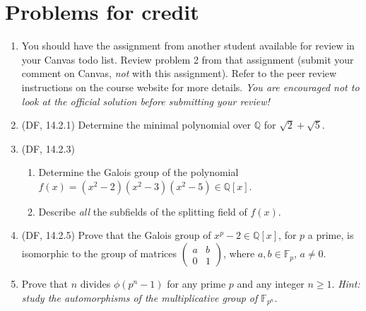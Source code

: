 \documentclass{amsart}
\theoremstyle{definition}
\newcommand{\Qq}{\mathbb{Q}}
\newcommand{\Ff}{\mathbb{F}}
\begin{document}
\section*{Problems for credit}
\begin{enumerate}
\item You should have the assignment from another student available for review in your Canvas todo list. Review problem 2 from that assignment (submit your comment on Canvas, \emph{not} with this assignment). Refer to the peer review instructions on the course website for more details. \emph{You are encouraged not to look at the official solution before submitting your review!}

\item (DF, 14.2.1) Determine the minimal polynomial over $\Qq$ for $\sqrt{2} + \sqrt{5}$.
\item (DF, 14.2.3)
  \begin{enumerate}
  \item Determine the Galois group of the polynomial $f(x) = (x^2 - 2)(x^2 - 3)(x^2 - 5) \in \Qq[x]$.
  \item Describe \emph{all} the subfields of the splitting field of $f (x)$.
  \end{enumerate}
\item (DF, 14.2.5) Prove that the Galois group of $x^p - 2 \in \Qq[x]$, for $p$ a prime, is isomorphic to the group of matrices $\begin{pmatrix}
a & b \\ 0 & 1 \end{pmatrix}$, where $a, b \in \Ff_p$, $a \neq 0$.

\item Prove that $n$ divides $\phi (p^n - 1)$ for any prime $p$ and any integer $n \ge 1$. \emph{Hint: study the automorphisms of the multiplicative group of $\Ff_{p^n}$}.

\end{enumerate}
\end{document}
